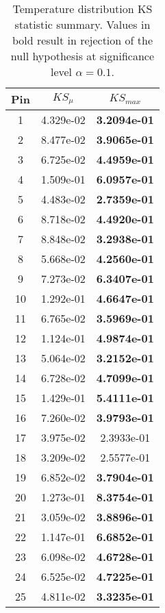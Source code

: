 \begin{table}[h]
    \begin{center}
    \caption[KS statistic temperature summary.]{Temperature distribution KS statistic summary. Values in bold result in rejection of the null hypothesis at significance level $\alpha=0.1$.}
    \begin{tabular}[h]{|c|c|c|}
        \hline
        Pin & $KS_\mu$ & $KS_{max}$ \\
\hline
1 &  4.329e-02 &  \textbf{3.2094e-01} \\
2 &  8.477e-02 &  \textbf{3.9065e-01} \\
3 &  6.725e-02 &  \textbf{4.4959e-01} \\
4 &  1.509e-01 &  \textbf{6.0957e-01} \\
5 &  4.483e-02 &  \textbf{2.7359e-01} \\
6 &  8.718e-02 &  \textbf{4.4920e-01} \\
7 &  8.848e-02 &  \textbf{3.2938e-01} \\
8 &  5.668e-02 &  \textbf{4.2560e-01} \\
9 &  7.273e-02 &  \textbf{6.3407e-01} \\
10 & 1.292e-01 &  \textbf{4.6647e-01} \\
11 & 6.765e-02 &\textbf{ 3.5969e-01} \\
12 & 1.124e-01 & \textbf{4.9874e-01} \\
13 & 5.064e-02 & \textbf{3.2152e-01} \\
14 & 6.728e-02 & \textbf{4.7099e-01} \\
15 & 1.429e-01 &\textbf{ 5.4111e-01} \\
16 & 7.260e-02 & \textbf{3.9793e-01} \\
17 & 3.975e-02 & 2.3933e-01 \\
18 & 3.209e-02 & 2.5577e-01 \\
19 & 6.852e-02 &\textbf{ 3.7904e-01} \\
20 & 1.273e-01 &\textbf{ 8.3754e-01} \\
21 & 3.059e-02 &\textbf{ 3.8896e-01} \\
22 & 1.147e-01 &\textbf{ 6.6852e-01} \\
23 & 6.098e-02 &\textbf{ 4.6728e-01} \\
24 & 6.525e-02 &\textbf{ 4.7225e-01} \\
25 & 4.811e-02 & \textbf{ 3.3235e-01} \\
\hline
\end{tabular}
\label{tab:ks_temp}
\end{center}
\end{table}


